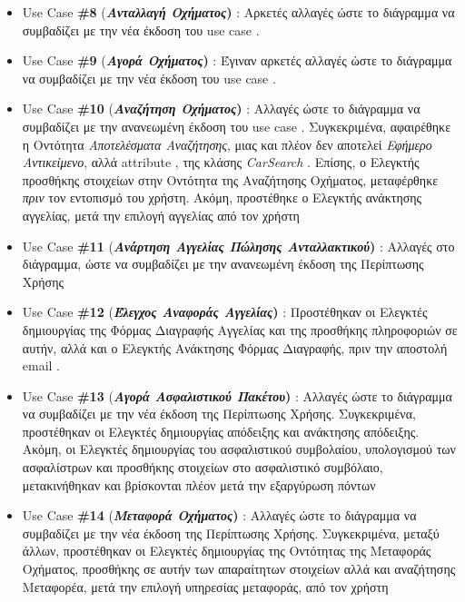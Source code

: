 \documentclass{../ol-softwaremanual}
\begin{document}
\begin{itemize}
	\item \en Use Case  \textbf{\#8} (\gr \textbf{\textit{Ανταλλαγή Οχήματος}) }: Αρκετές αλλαγές ώστε το διάγραμμα να συμβαδίζει με την νέα έκδοση του \en use case \gr.
	
	\item \en Use Case  \textbf{\#9} (\gr \textbf{\textit{Αγορά Οχήματος}) }: Έγιναν αρκετές αλλαγές ώστε το διάγραμμα να συμβαδίζει με την νέα έκδοση του \en use case \gr.
		
	\item \en Use Case  \textbf{\#10} (\gr \textbf{\textit{Αναζήτηση Οχήματος}) }: Αλλαγές ώστε το διάγραμμα να συμβαδίζει με την ανανεωμένη έκδοση του \en use case \gr. Συγκεκριμένα, αφαιρέθηκε η Οντότητα \textit{Αποτελέσματα Αναζήτησης}, μιας και πλέον δεν αποτελεί \textit{Εφήμερο Αντικείμενο}, αλλά \en attribute \gr, της κλάσης \en \textit{CarSearch} \gr. Επίσης, ο Ελεγκτής προσθήκης στοιχείων στην Οντότητα της Αναζήτησης Οχήματος, μεταφέρθηκε \textit{πριν} τον εντοπισμό του χρήστη. Ακόμη, προστέθηκε ο Ελεγκτής ανάκτησης αγγελίας, μετά την επιλογή αγγελίας από τον χρήστη
	
	
	\item \en Use Case  \textbf{\#11} (\gr \textbf{\textit{Ανάρτηση Αγγελίας Πώλησης Ανταλλακτικού}) }: Αλλαγές στο διάγραμμα, ώστε να συμβαδίζει με την ανανεωμένη έκδοση της Περίπτωσης Χρήσης
	
	\item \en Use Case  \textbf{\#12} (\gr \textbf{\textit{Έλεγχος Αναφοράς Αγγελίας}) }: Προστέθηκαν οι Ελεγκτές δημιουργίας της Φόρμας Διαγραφής Αγγελίας και της προσθήκης πληροφοριών σε αυτήν, αλλά και ο Ελεγκτής Ανάκτησης Φόρμας Διαγραφής, πριν την αποστολή \en email \gr.
	
	\item \en Use Case  \textbf{\#13} (\gr \textbf{\textit{Αγορά Ασφαλιστικού Πακέτου}) }: Αλλαγές ώστε το διάγραμμα να συμβαδίζει με την νέα έκδοση της Περίπτωσης Χρήσης. Συγκεκριμένα, προστέθηκαν οι Ελεγκτές δημιουργίας απόδειξης και ανάκτησης απόδειξης. Ακόμη, οι Ελεγκτές δημιουργίας του ασφαλιστικού συμβολαίου, υπολογισμού των ασφαλίστρων και προσθήκης στοιχείων στο ασφαλιστικό συμβόλαιο, μετακινήθηκαν και βρίσκονται πλέον μετά την εξαργύρωση πόντων
	
	
	\item \en Use Case  \textbf{\#14} (\gr \textbf{\textit{Μεταφορά Οχήματος}) }:  Αλλαγές ώστε το διάγραμμα να συμβαδίζει με την νέα έκδοση της Περίπτωσης Χρήσης. Συγκεκριμένα, μεταξύ άλλων, προστέθηκαν οι Ελεγκτές δημιουργίας της Οντότητας της Μεταφοράς Οχήματος, προσθήκης σε αυτήν των απαραίτητων στοιχείων αλλά και αναζήτησης Μεταφορέα, μετά την επιλογή υπηρεσίας μεταφοράς, από τον χρήστη
	
	
	\end{itemize}	
	
\end{document}
